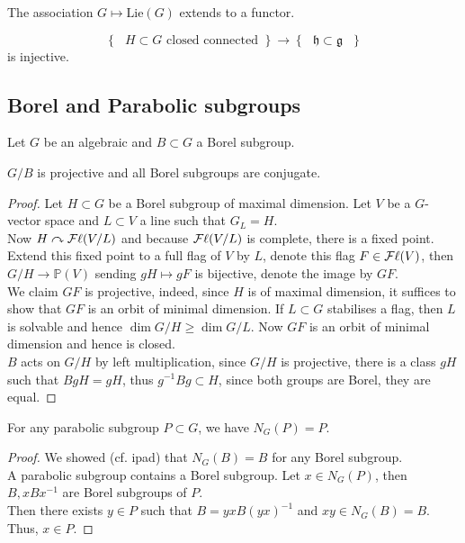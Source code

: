 \documentclass[../main.tex]{subfiles}
\begin{document}
The association $G \mapsto \mathrm{Lie}( G) $ extends to a functor.
\begin{thm}
	\[ 
		\left\{ \text{ $H \subset G$ closed connected  }   \right\} \to \left\{ \text{ $\mathfrak{h} \subset \mathfrak{g}$  }  \right\} 
	\]
	is injective.
	
\end{thm}
\subsection{Borel and Parabolic subgroups}
Let $G$ be an algebraic and $B \subset G$ a Borel subgroup.
\begin{thm}
$G /B$ is projective and all Borel subgroups are conjugate.	
\end{thm}
\begin{proof}
Let $H \subset G$ be a Borel subgroup of maximal dimension. Let $V$ be a $G$-vector space and $L \subset V$ a line such that $G_L = H$.\\
Now $H \curvearrowright \mathcal{F}\ell( V/L) $ and because $\mathcal{F}\ell( V /L) $ is complete, there is a fixed point.\\
Extend this fixed point to a full flag of $V$ by $L$, denote this flag $F\in \mathcal{F}\ell( V) $, then $G /H \to \mathbb{P}( V)$ sending $gH \mapsto gF$ is bijective, denote the image by $GF$.\\
We claim $GF$ is projective, indeed, since $H$ is of maximal dimension, it suffices to show that $GF$ is an orbit of minimal dimension. If $L \subset G$ stabilises a flag, then $L$ is solvable and hence $\dim G /H \geq \dim G /L$.
Now $GF$ is an orbit of minimal dimension and hence is closed.\\
$B$ acts on $G /H$ by left multiplication, since $G /H$ is projective, there is a class $gH$ such that $BgH = gH$, thus $g^{-1}Bg\subset H$, since both groups are Borel, they are equal.
\end{proof}
\begin{thm}
	For any parabolic subgroup $ P \subset G$, we have $N_G( P) = P$.
\end{thm}
\begin{proof}
We showed (cf. ipad) that $N_G( B) = B$ for any Borel subgroup.\\
A parabolic subgroup contains a Borel subgroup. Let $x\in N_G(P) $, then $B, xBx^{-1}$ are Borel subgroups of $P$.\\
Then there exists $y \in P$ such that $B = yxB( yx)^{-1}$ and $xy \in N_G( B) =B$.\\
Thus, $x \in P$.
\end{proof}
\end{document}
